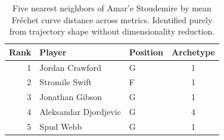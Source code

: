 \begin{table}[htbp]
  \centering\small
  \begin{tabular}{rllc}
    \toprule
    Rank & Player & Position & Archetype \\
    \midrule
    1 & Jordan Crawford & G & 1 \\
    2 & Stromile Swift & F & 1 \\
    3 & Jonathan Gibson & G & 1 \\
    4 & Aleksandar Djordjevic & G & 4 \\
    5 & Spud Webb & G & 1 \\
    \bottomrule
  \end{tabular}
  \caption{Five nearest neighbors of Amar'e Stoudemire by mean Fr\'{e}chet curve distance across metrics. Identified purely from trajectory shape without dimensionality reduction.}
  \label{tab:Amar_e_Stoudemire_frechet_curve_neighbors}
\end{table}


